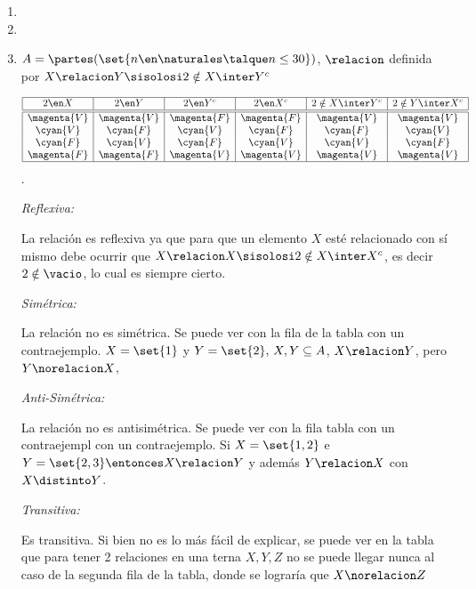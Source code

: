 \begin{enumerate}[label=\roman*)]
        
  \item \hacer
  \item \hacer
  \item $
          A =
          \partes(\set{n \en \naturales \talque n \leq 30})$, $\relacion$ definida por $X \relacion Y \sisolosi 2 \notin X \inter Y^c
        $\par
        $$
          \begin{array}{|c|c|c|c|c|c|}
            \hline
            2 \en X     & 2 \en Y     & 2 \en Y^c   & 2 \en X^c   & 2 \notin X \inter Y^c & 2 \notin Y \inter X^c \\ \hline  \hline
            \magenta{V} & \magenta{V} & \magenta{F} & \magenta{F} & \magenta{V}           & \magenta{V}           \\
            \cyan{V}    & \cyan{F}    & \cyan{V}    & \cyan{F}    & \cyan{F}              & \cyan{V}              \\
            \cyan{F}    & \cyan{V}    & \cyan{F}    & \cyan{V}    & \cyan{V}              & \cyan{F}              \\
            \magenta{F} & \magenta{F} & \magenta{V} & \magenta{V} & \magenta{V}           & \magenta{V}           \\ \hline
          \end{array}$$.

        \textit{Reflexiva:}\par
        La relación es reflexiva ya que para que un elemento $X$ esté relacionado con sí mismo debe ocurrir
        que $X \relacion X \sisolosi 2 \notin X \inter X^c$, es decir $2 \notin \vacio$, lo cual es siempre cierto.

        \textit{Simétrica:}\par
        La relación no es simétrica. Se puede ver con la  fila de la tabla con un contraejemplo.
        $X = \set{1}$ y $Y = \set{2},\, X,Y \subseteq A$, $X \relacion Y$, pero $Y \norelacion X$,

        \textit{Anti-Simétrica:}\par
        La relación no es antisimétrica. Se puede ver con la  fila tabla con un contraejempl
        con un contraejemplo. Si $X = \set{1,2}$ e $Y = \set{2,3} \entonces X \relacion Y$ y además $Y \relacion X$
        con  $X \distinto Y$.

        \textit{Transitiva:}\par
        Es transitiva. Si bien no es lo más fácil de explicar, se puede ver en la tabla que para tener 2 relaciones
        en una terna $X, Y, Z$ no se puede llegar nunca al caso de la segunda fila de la tabla, donde se lograría que
        $X \norelacion Z$


\end{enumerate}
